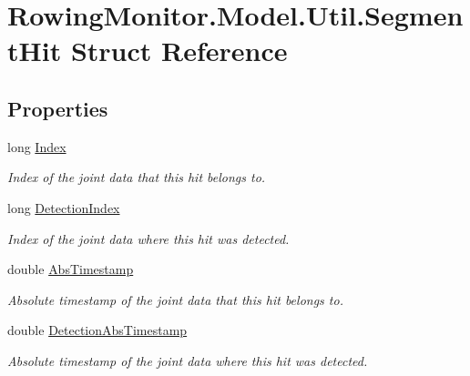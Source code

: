 \hypertarget{struct_rowing_monitor_1_1_model_1_1_util_1_1_segment_hit}{}\section{Rowing\+Monitor.\+Model.\+Util.\+Segment\+Hit Struct Reference}
\label{struct_rowing_monitor_1_1_model_1_1_util_1_1_segment_hit}
\subsection*{Properties}
\begin{DoxyCompactItemize}
\item 
long \hyperlink{struct_rowing_monitor_1_1_model_1_1_util_1_1_segment_hit_aaf855f224da3b43af2ea5f7896914efb}{Index}
\begin{DoxyCompactList}\small\item\em Index of the joint data that this hit belongs to. \end{DoxyCompactList}\item 
long \hyperlink{struct_rowing_monitor_1_1_model_1_1_util_1_1_segment_hit_ad943df68e8adfeaa2b76701701cef0df}{Detection\+Index}
\begin{DoxyCompactList}\small\item\em Index of the joint data where this hit was detected. \end{DoxyCompactList}\item 
double \hyperlink{struct_rowing_monitor_1_1_model_1_1_util_1_1_segment_hit_ab40df6a59087cfd176f989111279a5e2}{Abs\+Timestamp}
\begin{DoxyCompactList}\small\item\em Absolute timestamp of the joint data that this hit belongs to. \end{DoxyCompactList}\item 
double \hyperlink{struct_rowing_monitor_1_1_model_1_1_util_1_1_segment_hit_ab9778fc572f014c1d75de5898f8c83d2}{Detection\+Abs\+Timestamp}
\begin{DoxyCompactList}\small\item\em Absolute timestamp of the joint data where this hit was detected. \end{DoxyCompactList}\item 

\end{DoxyCompactItemize}
